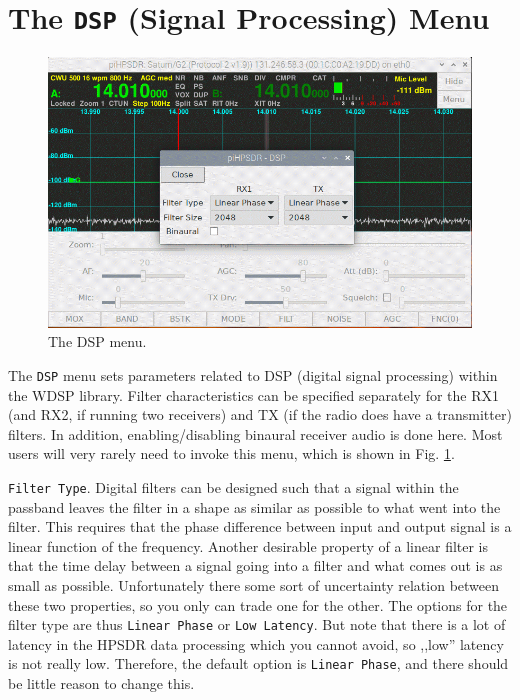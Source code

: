\documentclass[12pt]{book}
\def\rett#1{\texttt{\color{red}#1}}
\def\bltt#1{\texttt{\color{blue}#1}}
\begin{document}
\section{The \texttt{DSP} (Signal Processing) Menu}

\begin{figure}[ht]
\center
\includegraphics[width=12cm]{DSPMenu.png}
\caption{The DSP menu.}
\label{fig:DSPMenu}
\end{figure}

The \bltt{DSP} menu sets parameters related to DSP (digital signal processing)
within the WDSP library.
Filter characteristics can be specified separately for the RX1 (and RX2, if
running two receivers) and TX (if the radio does have a transmitter)
filters. In addition, enabling/disabling binaural receiver audio
is done here.  Most users will
very rarely need to invoke this menu, which is shown
in Fig. \ref{fig:DSPMenu}.

\rett{Filter Type}. Digital filters can be designed such that a signal within the
passband leaves the filter in a shape as similar as possible
to what went into the filter. This requires that the phase
difference between input and output signal is a linear
function of the frequency. Another desirable property
of a linear filter is that the time delay between a signal
going into a filter and what comes out is as small as
possible. Unfortunately there some sort of uncertainty
relation between these two properties, so you only can
trade one for the other. The options for the filter type
are thus \rett{Linear Phase} or \rett{Low Latency}.
But note that there is a lot of latency in the HPSDR data
processing which you cannot avoid, so ,,low'' latency
is not really low. Therefore, the default option
is \rett{Linear Phase}, and there should be little reason
to change this.
\end{document}
